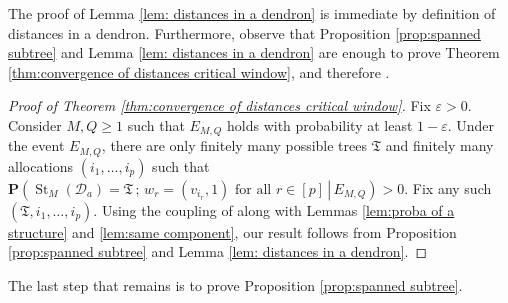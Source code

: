 \documentclass{article}
\theoremstyle{remark}
\newcommand{\cD}{\mathcal{D}}
\newcommand{\probcond}[2]{\mathbf{P}{\left(\left. #1 \,\right|\, #2 \right)}}
\DeclareMathOperator{\St}{St}
\begin{document}
The proof of Lemma \ref{lem: distances in a dendron} is immediate by definition of distances in a dendron. 
Furthermore, observe that Proposition \ref{prop:spanned subtree} and Lemma \ref{lem: distances in a dendron} are enough to prove Theorem \ref{thm:convergence of distances critical window}, and therefore .

\begin{proof}[Proof of Theorem \ref{thm:convergence of distances critical window}]
Fix $\varepsilon>0$. Consider $M,Q \geq 1$ such that $E_{M,Q}$ holds with probability at least $1-\varepsilon$. 
Under the event $E_{M,Q}$, there are only finitely many possible trees $\mathfrak{T}$ and finitely many allocations $(i_1, \ldots, i_p)$ such that $\probcond{ \St_M(\cD_a)=\mathfrak{T} \, ; \, w_r = (v_{i_r},1) \text{ for all } r \in [p] }{ E_{M,Q}}>0$. 
Fix any such $(\mathfrak{T},i_1,\ldots,i_p)$. 
Using the coupling of  along with Lemmas \ref{lem:proba of a structure} and \ref{lem:same component}, our result follows from Proposition \ref{prop:spanned subtree} and Lemma \ref{lem: distances in a dendron}.
\end{proof}

The last step that remains is to prove Proposition \ref{prop:spanned subtree}.
\end{document}
